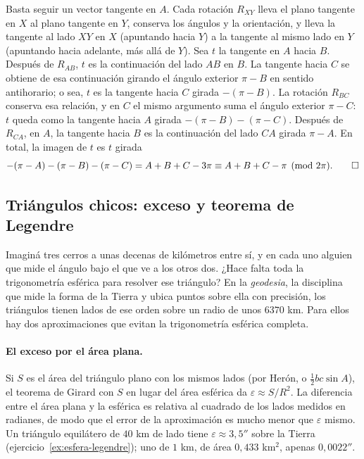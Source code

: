 \begin{demostracion}
Basta seguir un vector tangente en \(A\). Cada rotación \(R_{XY}\) lleva el plano tangente en
\(X\) al plano tangente en \(Y\), conserva los ángulos y la orientación, y lleva la tangente
al lado \(XY\) en \(X\) (apuntando hacia \(Y\)) a la tangente al mismo lado en \(Y\) (apuntando
hacia adelante, más allá de \(Y\)). Sea \(t\) la tangente en \(A\) hacia \(B\). Después de
\(R_{AB}\), \(t\) es la continuación del lado \(AB\) en \(B\). La tangente hacia \(C\) se
obtiene de esa continuación girando el ángulo exterior \(\pi-B\) en sentido antihorario; o
sea, \(t\) es la tangente hacia \(C\) girada \(-(\pi-B)\). La rotación \(R_{BC}\) conserva esa
relación, y en \(C\) el mismo argumento suma el ángulo exterior \(\pi-C\): \(t\) queda como la
tangente hacia \(A\) girada \(-(\pi-B)-(\pi-C)\). Después de \(R_{CA}\), en \(A\), la tangente
hacia \(B\) es la continuación del lado \(CA\) girada \(\pi-A\). En total, la imagen de \(t\)
es \(t\) girada
\[
  -(\pi-A)-(\pi-B)-(\pi-C)=A+B+C-3\pi\equiv A+B+C-\pi\pmod{2\pi}. \qedhere
\]
\end{demostracion}

\subsection{Triángulos chicos: exceso y teorema de Legendre}

Imaginá tres cerros a unas decenas de kilómetros entre sí, y en cada uno alguien que mide el
ángulo bajo el que ve a los otros dos. ¿Hace falta toda la trigonometría esférica para
resolver ese triángulo? En la \emph{geodesia}, la disciplina que mide la forma de la Tierra y
ubica puntos sobre ella con precisión, los triángulos tienen lados de ese orden sobre un radio
de unos \(6370\) km. Para ellos hay dos aproximaciones que evitan la trigonometría esférica
completa.

\paragraph{El exceso por el área plana.} Si \(S\) es el área del triángulo plano con los
mismos lados (por Herón, o \(\frac12 bc\sin A\)), el teorema de Girard con \(S\) en lugar del
área esférica da \(\varepsilon\approx S/R^2\). La diferencia entre el área plana y la esférica es relativa al cuadrado de los lados medidos
en radianes, de modo que el error de la aproximación es mucho menor que \(\varepsilon\) mismo.
Un triángulo equilátero de \(40\) km de lado tiene \(\varepsilon\approx3{,}5''\) sobre la
Tierra (ejercicio~\ref{ex:esfera-legendre}); uno de \(1\) km, de área \(0{,}433\) km\(^2\), apenas \(0{,}0022''\).

